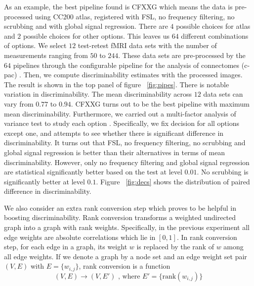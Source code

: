 \documentclass{article}
\begin{document}
As an example, the best pipeline found is CFXXG which means the data is pre-processed using CC200 atlas, registered with FSL, no frequency filtering, no scrubbing and with global signal regression. There are $4$ possible choices for atlas and $2$ possible choices for other options. This leaves us $64$ different combinations of options. We select $12$ test-retest fMRI data sets with the number of measurements ranging from $50$ to $244$. These data sets are pre-processed by the $64$ pipelines through the configurable pipeline for the analysis of connectomes (c-pac) \cite{sikka2014towards}. Then, we compute discriminability estimates with the processed images. The result is shown in the top panel of figure ~\ref{fig:pipes}. There is notable variation in discriminability. The mean discriminability across $12$ data sets can vary from $0.77$ to $0.94$. CFXXG turns out to be the best pipeline with maximum mean discriminability. Furthermore, we carried out a multi-factor analysis of variance test to study each option \cite{hair2009multivariate}. Specifically, we fix decision for all options except one, and attempts to see whether there is significant difference in discriminability. It turns out that FSL, no frequency filtering, no scrubbing and global signal regression is better than their alternatives in terms of mean discriminability. However, only no frequency filtering and global signal regression are statistical significantly better based on the test at level $0.01$. No scrubbing is significantly better at level $0.1$. Figure ~\ref{fig:decs} shows the distribution of paired difference in discriminability.

We also consider an extra rank conversion step which proves to be helpful in boosting discriminability. Rank conversion transforms a weighted undirected graph into a graph with rank weights. Specifically, in the previous experiment all edge weights are absolute correlations which lie in $[0,1]$. In rank conversion step, for each edge in a graph, its weight $w$ is replaced by the rank of $w$ among all edge weights. If we denote a graph by a node set and an edge weight set pair $(V,E)$ with $E=\{w_{i,j}\}$, rank conversion is a function
\[(V,E) \rightarrow (V,E') \text{ , where } E'= \{\text{rank}(w_{i,j})\} \]
\end{document}

